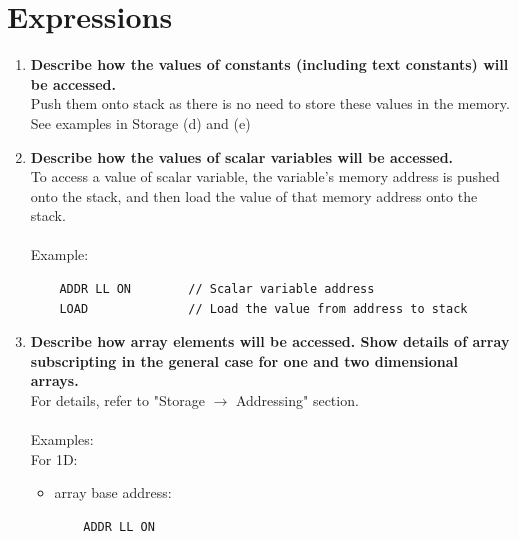 \documentclass[11pt]{article}
\begin{document}
\section*{Expressions}
\begin{enumerate}[label=(\alph*)]
\item \textbf{Describe how the values of constants (including text
    constants) will be accessed.}\\
    Push them onto stack as there is no need to store these values in
    the memory. See examples in Storage (d) and (e)
    
\item \textbf{Describe how the values of scalar variables will be
	accessed.}\\
	To access a value of scalar variable, the variable's memory address
    is pushed onto the stack, and then load the value of that memory
    address onto the stack.\\
    \\
    Example:
    \begin{lstlisting}
    ADDR LL ON        // Scalar variable address
    LOAD              // Load the value from address to stack
    \end{lstlisting}
    
\item \textbf{Describe how array elements will be accessed.
Show details of array subscripting in the general case for one and two
dimensional arrays.}\\

    For details, refer to "Storage $\rightarrow$ Addressing" section.\\
    \\
Examples:\\
For 1D:
\begin{itemize}
\item array base address:
	\begin{lstlisting}
    ADDR LL ON
    \end{lstlisting}


\end{itemize}
\end{enumerate}
\end{document}
